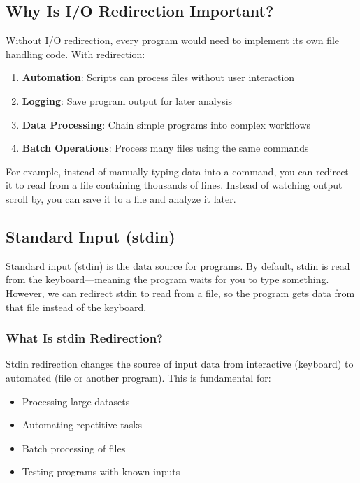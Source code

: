 \subsection{Why Is I/O Redirection Important?}

Without I/O redirection, every program would need to implement its own file handling code. With redirection:
\begin{enumerate}
	\item \textbf{Automation}: Scripts can process files without user interaction
	\item \textbf{Logging}: Save program output for later analysis
	\item \textbf{Data Processing}: Chain simple programs into complex workflows
	\item \textbf{Batch Operations}: Process many files using the same commands
\end{enumerate}

For example, instead of manually typing data into a  command, you can redirect it to read from a file containing thousands of lines. Instead of watching output scroll by, you can save it to a file and analyze it later.

\subsection{Standard Input (stdin)}

Standard input (stdin) is the data source for programs. By default, stdin is read from the keyboard---meaning the program waits for you to type something. However, we can redirect stdin to read from a file, so the program gets data from that file instead of the keyboard.

\subsubsection{What Is stdin Redirection?}

Stdin redirection changes the source of input data from interactive (keyboard) to automated (file or another program). This is fundamental for:
\begin{itemize}
	\item Processing large datasets
	\item Automating repetitive tasks
	\item Batch processing of files
	\item Testing programs with known inputs
\end{itemize}


